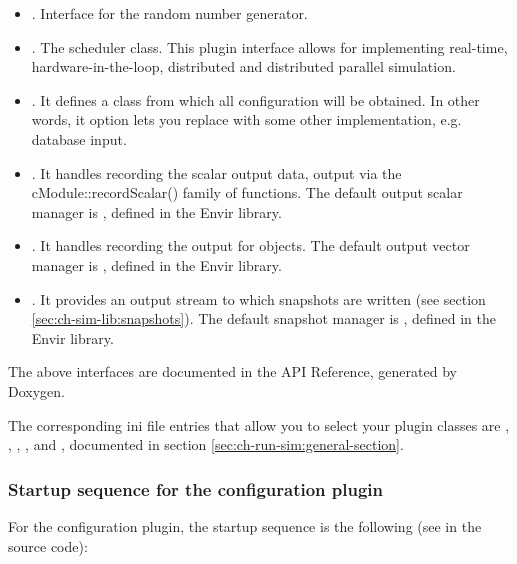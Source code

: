 \begin{itemize}
   \item{. Interface for the random number generator.}
   \item{. The scheduler class. This plugin interface
     allows for implementing real-time, hardware-in-the-loop, distributed
     and distributed parallel simulation.}
   \item{. It defines a class
     from which all configuration will be obtained. In other words, it
     option lets you replace  with some other implementation,
     e.g. database input.}
   \item{. It handles recording the scalar output data,
     output via the cModule::recordScalar() family of functions.
     The default output scalar manager is ,
     defined in the Envir library.}
   \item{. It handles recording the output
     for  objects.
     The default output vector manager is ,
     defined in the Envir library.}
   \item{. It provides an output stream to which
     snapshots are written (see section \ref{sec:ch-sim-lib:snapshots}).
     The default snapshot manager is ,
     defined in the Envir library.}
\end{itemize}

The above interfaces are documented in the API Reference, generated by Doxygen.

The corresponding ini file entries that allow you to select your
plugin classes are , ,
, ,
 and ,
documented in section \ref{sec:ch-run-sim:general-section}.


\subsubsection{Startup sequence for the configuration plugin}

For the configuration plugin, the startup sequence is the following
(see  in the source code):

